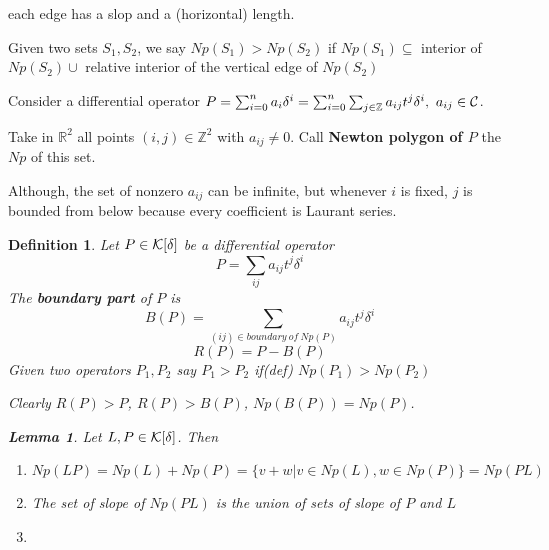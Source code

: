 \documentclass[11pt]{article}
\newtheorem{lemma}[thm]{Lemma}
\newtheorem{dfn}[thm]{Definition}
\newcommand{\reals}{\mathbb R}
\newcommand{\intg}{\mathbb Z}
\newcommand{\calc}{{\cal C}}
\newcommand{\calk}{{\cal K}}
\begin{document}
each edge has a slop and a (horizontal) length.


Given two sets $S_1,S_2$, we say $Np(S_1)>Np(S_2)$ if $Np(S_1)\subseteq $ interior of $Np(S_2)\cup$ relative interior of the vertical edge of $Np(S_2)$


Consider a differential operator
$P=\sum^n_{i=0}a_i\delta^i=\sum^n_{i=0}\sum_{j\in \intg}a_{ij}t^j\delta^i,\ a_{ij}\in\calc$.

Take in $\reals^2$ all points $(i,j)\in \intg^2$ with $a_{ij}\neq 0$. Call \textbf{Newton polygon of $P$} the $Np$ of this set.

Although, the set of nonzero $a_{ij}$ can be infinite, but whenever $i$ is fixed, $j$ is bounded from below because every coefficient is Laurant series.

\begin{dfn}
Let $P\in \calk[\delta]$ be a differential operator
$$
P=\sum_{ij}a_{ij}t^j\delta^i
$$
The \textbf{boundary part} of $P$ is 
$$
B(P)=\sum_{(ij)\in boundary\ of\ Np(P)} a_{ij}t^j\delta^i
$$ 
$$
R(P)=P-B(P)
$$
Given two operators $P_1,P_2$ say $P_1>P_2$ if(def) $Np(P_1)>Np(P_2)$

Clearly
$R(P)>P$, $R(P)>B(P)$, $Np(B(P))=Np(P)$.

\begin{lemma}
Let $L,P\in \calk[\delta]$. Then
\begin{enumerate}
\item $Np(LP)=Np(L)+Np(P)=\{v+w|v\in Np(L),w\in Np(P)\}=Np(PL)$
\item The set of slope of $Np(PL)$ is the union of sets of slope of $P$ and $L$
\item 
\end{enumerate}
\end{lemma}

\end{dfn}
\end{document}
